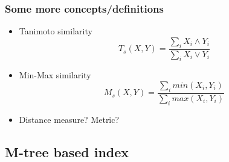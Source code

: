 \documentclass{beamer}
\begin{document}
\begin{frame}
\frametitle{Some more concepts/definitions}

\begin{itemize}
	\item<1-> Tanimoto similarity
	\begin{equation}
	T_s(X,Y) = \frac{\sum \limits_i X_i \wedge Y_i} {\sum \limits_i X_i \vee Y_i}	
	\end{equation}
	\item<2-> Min-Max similarity
	\begin{equation}
	M_s(X,Y) = \frac{\sum \limits_{i} min(X_i, Y_i)}{\sum \limits_{i} max(X_i, Y_i)}
	\end{equation}	
	\item<3-> Distance measure? Metric?
\end{itemize}

\end{frame}

%
%
%	  
%


\subsection{M-tree based index}
\end{document}
